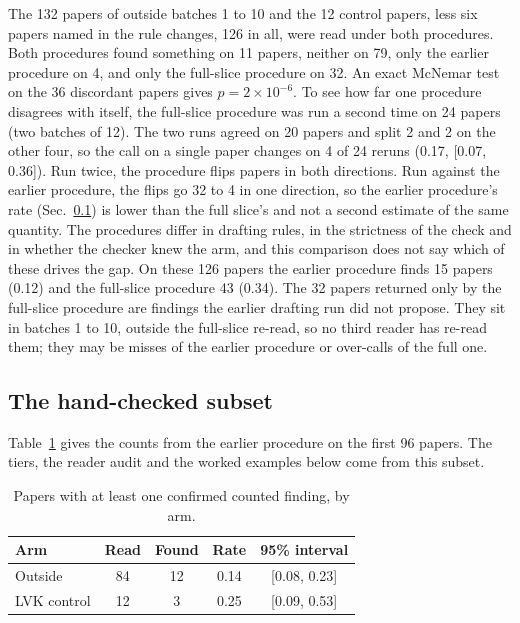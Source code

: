 \documentclass[reprint,amsmath,amssymb,aps,superscriptaddress,nofootinbib]{revtex4-2}
\begin{document}
The 132 papers of outside batches 1 to 10 and the 12 control papers, less six papers named in the rule changes, 126 in all, were read under both procedures. Both procedures found something on 11 papers, neither on 79, only the earlier procedure on 4, and only the full-slice procedure on 32. An exact McNemar test on the 36 discordant papers gives $p = 2\times10^{-6}$. To see how far one procedure disagrees with itself, the full-slice procedure was run a second time on 24 papers (two batches of 12). The two runs agreed on 20 papers and split 2 and 2 on the other four, so the call on a single paper changes on 4 of 24 reruns (0.17, [0.07, 0.36]). Run twice, the procedure flips papers in both directions. Run against the earlier procedure, the flips go 32 to 4 in one direction, so the earlier procedure's rate (Sec.~\ref{sec:rates}) is lower than the full slice's and not a second estimate of the same quantity. The procedures differ in drafting rules, in the strictness of the check and in whether the checker knew the arm, and this comparison does not say which of these drives the gap. On these 126 papers the earlier procedure finds 15 papers (0.12) and the full-slice procedure 43 (0.34). The 32 papers returned only by the full-slice procedure are findings the earlier drafting run did not propose. They sit in batches 1 to 10, outside the full-slice re-read, so no third reader has re-read them; they may be misses of the earlier procedure or over-calls of the full one.

\subsection{The hand-checked subset}
\label{sec:rates}

Table~\ref{tab:rates} gives the counts from the earlier procedure on the first 96 papers. The tiers, the reader audit and the worked examples below come from this subset.

\begin{table}[t]
\caption{Papers with at least one confirmed counted finding, by arm.}
\label{tab:rates}
\centering\small\setlength{\tabcolsep}{4pt}
\begin{tabular}{lcccc}
\hline\hline
Arm & Read & Found & Rate & 95\% interval \\ \hline
Outside & 84 & 12 & 0.14 & [0.08, 0.23] \\
LVK control & 12 & 3 & 0.25 & [0.09, 0.53] \\
\hline\hline
\end{tabular}
\end{table}
\end{document}
